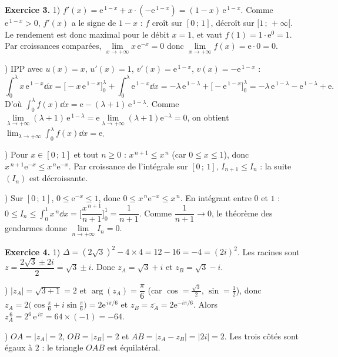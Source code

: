 \medskip
\noindent\textbf{Exercice 3.}
1) $f'(x)=\mathrm{e}^{\,1-x}+x\cdot(-\mathrm{e}^{\,1-x})=(1-x)\,\mathrm{e}^{\,1-x}$. Comme $\mathrm{e}^{\,1-x}>0$,
$f'(x)$ a le signe de $1-x$ : $f$ croît sur $[0\,;\,1]$, décroît sur $[1\,;\,+\infty[$. Le rendement
est donc maximal pour le débit $x=1$, et vaut $f(1)=1\cdot\mathrm{e}^{0}=1$. Par croissances comparées,
$\lim\limits_{x\to+\infty}x\,\mathrm{e}^{-x}=0$ donc $\lim\limits_{x\to+\infty}f(x)=\mathrm{e}\cdot0=0$.

) IPP avec $u(x)=x$, $u'(x)=1$, $v'(x)=\mathrm{e}^{\,1-x}$, $v(x)=-\mathrm{e}^{\,1-x}$ :
\[\int_0^{\lambda}x\,\mathrm{e}^{\,1-x}\dd x=\big[-x\,\mathrm{e}^{\,1-x}\big]_0^{\lambda}+\int_0^{\lambda}\mathrm{e}^{\,1-x}\dd x
=-\lambda\,\mathrm{e}^{\,1-\lambda}+\big[-\mathrm{e}^{\,1-x}\big]_0^{\lambda}
=-\lambda\,\mathrm{e}^{\,1-\lambda}-\mathrm{e}^{\,1-\lambda}+\mathrm{e}.\]
D'où $\displaystyle\int_0^{\lambda}f(x)\dd x=\mathrm{e}-(\lambda+1)\,\mathrm{e}^{\,1-\lambda}$. Comme
$\lim\limits_{\lambda\to+\infty}(\lambda+1)\,\mathrm{e}^{\,1-\lambda}=\mathrm{e}\lim\limits_{\lambda\to+\infty}(\lambda+1)\mathrm{e}^{-\lambda}=0$,
on obtient $\displaystyle\lim_{\lambda\to+\infty}\int_0^{\lambda}f(x)\dd x=\mathrm{e}$.

) Pour $x\in[0\,;\,1]$ et tout $n\ge0$ : $x^{\,n+1}\le x^{\,n}$ (car $0\le x\le1$), donc
$x^{\,n+1}\mathrm{e}^{-x}\le x^{\,n}\mathrm{e}^{-x}$. Par croissance de l'intégrale sur $[0\,;\,1]$,
$I_{n+1}\le I_n$ : la suite $(I_n)$ est décroissante.

) Sur $[0\,;\,1]$, $0\le\mathrm{e}^{-x}\le1$, donc $0\le x^{\,n}\mathrm{e}^{-x}\le x^{\,n}$. En
intégrant entre $0$ et $1$ : $0\le I_n\le\displaystyle\int_0^1 x^{\,n}\dd x=\Big[\dfrac{x^{\,n+1}}{n+1}\Big]_0^1=\dfrac{1}{n+1}$.
Comme $\dfrac{1}{n+1}\to0$, le théorème des gendarmes donne $\lim\limits_{n\to+\infty}I_n=0$.

\medskip
\noindent\textbf{Exercice 4.}
1) $\Delta=(2\sqrt3)^2-4\times4=12-16=-4=(2i)^2$. Les racines sont
$z=\dfrac{2\sqrt3\pm2i}{2}=\sqrt3\pm i$. Donc $z_A=\sqrt3+i$ et $z_B=\sqrt3-i$.

) $|z_A|=\sqrt{3+1}=2$ et $\arg(z_A)=\dfrac\pi6$ (car $\cos=\frac{\sqrt3}{2}$, $\sin=\frac12$),
donc $z_A=2\big(\cos\frac\pi6+i\sin\frac\pi6\big)=2\mathrm{e}^{\,i\pi/6}$ et $z_B=\overline{z_A}=2\mathrm{e}^{-i\pi/6}$.
Alors $z_A^{\,6}=2^6\,\mathrm{e}^{\,i\pi}=64\times(-1)=-64$.

) $OA=|z_A|=2$, $OB=|z_B|=2$ et $AB=|z_A-z_B|=|2i|=2$. Les trois côtés sont égaux à $2$ :
le triangle $OAB$ est équilatéral.

